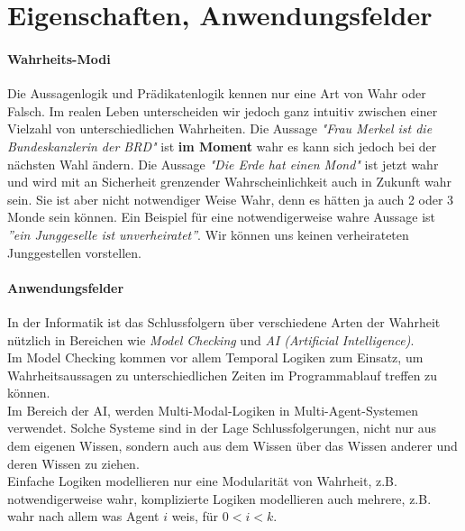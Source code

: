 
\section{Eigenschaften, Anwendungsfelder} %
\label{sec:eigenschaften_anwendungsfelder}

\paragraph{Wahrheits-Modi} %
\label{par:wahrheits_modi}

Die Aussagenlogik und Prädikatenlogik kennen nur eine Art von Wahr oder Falsch. Im realen Leben unterscheiden wir jedoch ganz intuitiv zwischen einer Vielzahl von unterschiedlichen Wahrheiten.
Die Aussage \emph{"Frau Merkel ist die Bundeskanzlerin der BRD"} ist \textbf{im Moment} wahr es kann sich jedoch bei der nächsten Wahl ändern.
Die Aussage \emph{"Die Erde hat einen Mond"} ist jetzt wahr und wird mit an Sicherheit grenzender Wahrscheinlichkeit auch in Zukunft wahr sein. 
Sie ist aber nicht notwendiger Weise Wahr, denn es hätten ja auch 2 oder 3 Monde sein können.
Ein Beispiel für eine notwendigerweise wahre Aussage ist \emph{''ein Junggeselle ist unverheiratet''}. Wir können uns keinen verheirateten Junggestellen vorstellen.


\paragraph{Anwendungsfelder} %
\label{par:anwendungsfelder}

In der Informatik ist das Schlussfolgern über verschiedene Arten der Wahrheit nützlich in Bereichen wie \emph{Model Checking} und \emph{AI (Artificial Intelligence)}. \\
Im Model Checking kommen vor allem Temporal Logiken zum Einsatz, um Wahrheitsaussagen zu unterschiedlichen Zeiten im Programmablauf treffen zu können. \\
Im Bereich der AI, werden Multi-Modal-Logiken in Multi-Agent-Systemen verwendet. 
Solche Systeme sind in der Lage Schlussfolgerungen, nicht nur aus dem eigenen Wissen, sondern auch aus dem Wissen über das Wissen anderer und deren Wissen zu ziehen.\\
Einfache Logiken modellieren nur eine Modularität von Wahrheit, z.B. notwendigerweise wahr, komplizierte Logiken modellieren auch mehrere, z.B. wahr nach allem was Agent $i$ weis, für $ 0 < i < k$. \cite[S.306f]{huth2004logic}\\

